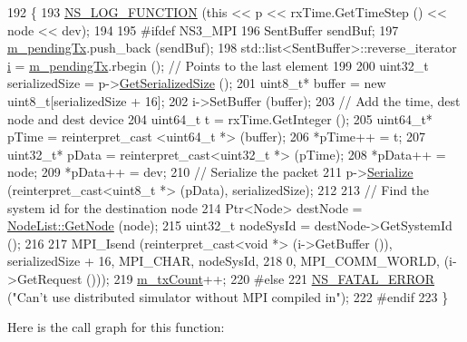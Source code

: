 \begin{DoxyCode}
192 \{
193   \hyperlink{log-macros-disabled_8h_a90b90d5bad1f39cb1b64923ea94c0761}{NS\_LOG\_FUNCTION} (\textcolor{keyword}{this} << p << rxTime.GetTimeStep () << node << dev);
194 
195 \textcolor{preprocessor}{#ifdef NS3\_MPI}
196   SentBuffer sendBuf;
197   \hyperlink{classns3_1_1GrantedTimeWindowMpiInterface_aa693374d000a2eb89e4cef36dbea17a0}{m\_pendingTx}.push\_back (sendBuf);
198   std::list<SentBuffer>::reverse\_iterator \hyperlink{bernuolliDistribution_8m_a6f6ccfcf58b31cb6412107d9d5281426}{i} = \hyperlink{classns3_1_1GrantedTimeWindowMpiInterface_aa693374d000a2eb89e4cef36dbea17a0}{m\_pendingTx}.rbegin (); \textcolor{comment}{// Points to the last
       element}
199 
200   uint32\_t serializedSize = p->\hyperlink{classns3_1_1Packet_a7416c3bc8c1a9a86c8ade4dfd1d67d2d}{GetSerializedSize} ();
201   uint8\_t* buffer =  \textcolor{keyword}{new} uint8\_t[serializedSize + 16];
202   i->SetBuffer (buffer);
203   \textcolor{comment}{// Add the time, dest node and dest device}
204   uint64\_t t = rxTime.GetInteger ();
205   uint64\_t* pTime = reinterpret\_cast <uint64\_t *> (buffer);
206   *pTime++ = t;
207   uint32\_t* pData = \textcolor{keyword}{reinterpret\_cast<}uint32\_t *\textcolor{keyword}{>} (pTime);
208   *pData++ = node;
209   *pData++ = dev;
210   \textcolor{comment}{// Serialize the packet}
211   p->\hyperlink{classns3_1_1Packet_a939e41b065c6f9f77d3f51373baeaf7e}{Serialize} (reinterpret\_cast<uint8\_t *> (pData), serializedSize);
212 
213   \textcolor{comment}{// Find the system id for the destination node}
214   Ptr<Node> destNode = \hyperlink{classns3_1_1NodeList_a80ac09977d48d29db5c704ac8483cf6c}{NodeList::GetNode} (node);
215   uint32\_t nodeSysId = destNode->GetSystemId ();
216 
217   MPI\_Isend (reinterpret\_cast<void *> (i->GetBuffer ()), serializedSize + 16, MPI\_CHAR, nodeSysId,
218              0, MPI\_COMM\_WORLD, (i->GetRequest ()));
219   \hyperlink{classns3_1_1GrantedTimeWindowMpiInterface_a9a5af8c59f7ef88b328df8ea986124d8}{m\_txCount}++;
220 \textcolor{preprocessor}{#else}
221   \hyperlink{group__fatal_ga5131d5e3f75d7d4cbfd706ac456fdc85}{NS\_FATAL\_ERROR} (\textcolor{stringliteral}{"Can't use distributed simulator without MPI compiled in"});
222 \textcolor{preprocessor}{#endif}
223 \}
\end{DoxyCode}


Here is the call graph for this function\+:


